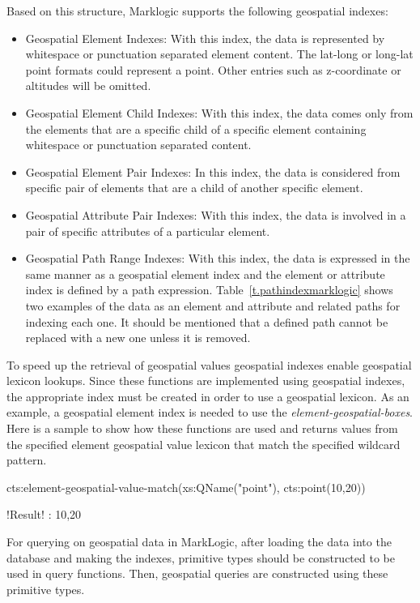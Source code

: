 \documentclass[a4paper,12pt]{article}
\begin{document}
\vspace{10px}
Based on this structure, Marklogic supports the following geospatial indexes:
\begin{itemize}
\item Geospatial Element Indexes: With this index, the data is represented by whitespace or punctuation separated element content. The lat-long or long-lat point formats could represent a point. Other entries such as z-coordinate or altitudes will be omitted.
\item Geospatial Element Child Indexes: With this index, the data comes only from the elements that are a specific child of a specific element containing whitespace or punctuation separated content.
\item Geospatial Element Pair Indexes: In this index, the data is considered from specific pair of elements that are a child of another specific element.
\item Geospatial Attribute Pair Indexes: With this index, the data is involved in a pair of specific attributes of a particular element.
\item Geospatial Path Range Indexes: With this index, the data is expressed in the same manner as a geospatial element index and the element or attribute index is defined by a path expression. Table~\ref{t.pathindexmarklogic} shows two examples of the data as an element and attribute and related paths for indexing each one. It should be mentioned that a defined path cannot be replaced with a new one unless it is removed.
\end{itemize}

To speed up the retrieval of geospatial values geospatial indexes enable geospatial lexicon lookups. Since these functions are implemented using geospatial indexes, the appropriate index must be created in order to use a geospatial lexicon. As an example, a geospatial element index is needed to use the \textit{element-geospatial-boxes}. Here is a sample to show how these functions are used and returns values from the specified element geospatial value lexicon that match the specified wildcard pattern.
\vspace{10px}
\begin{fakeJSON}[escapechar=\!]
cts:element-geospatial-value-match(xs:QName("point"),
cts:point(10,20))

!\colorbox{light-gray}{Result}! : 10,20
\end{fakeJSON}
\vspace{10px}

For querying on geospatial data in MarkLogic, after loading the data into the database and making the indexes, primitive types should be constructed to be used in query functions. Then, geospatial queries are constructed using these primitive types. 
\end{document}
